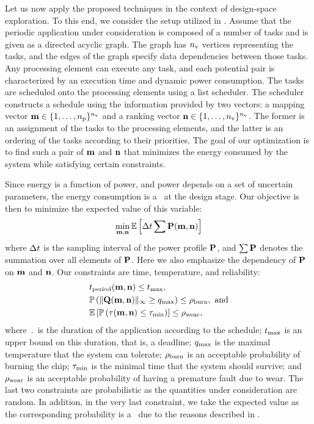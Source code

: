 Let us now apply the proposed techniques in the context of design-space exploration.
To this end, we consider the setup utilized in \cite{ukhov2012}.
Assume that the periodic application under consideration is composed of a number of tasks and is given as a directed acyclic graph.
The graph has ${n_\text{v}}$ vertices representing the tasks, and the edges of the graph specify data dependencies between those tasks.
Any processing element can execute any task, and each potential pair is characterized by an execution time and dynamic power consumption.
The tasks are scheduled onto the processing elements using a list scheduler.
The scheduler constructs a schedule using the information provided by two vectors: a mapping vector $\mathbf{m} \in \{ 1, \dotsc, {n_\text{p}} \}^{n_\text{v}}$ and a ranking vector $\mathbf{n} \in \{ 1, \dotsc, {n_\text{v}} \}^{n_\text{v}}$.
The former is an assignment of the tasks to the processing elements, and the latter is an ordering of the tasks according to their priorities.
The goal of our optimization is to find such a pair of $\mathbf{m}$ and $\mathbf{n}$ that minimizes the energy consumed by the system while satisfying certain constraints.

Since energy is a function of power, and power depends on a set of uncertain parameters, the energy consumption is a \rv\ at the design stage.
Our objective is then to minimize the expected value of this variable:
\begin{equation} \elab{objective}
  \min_{\mapping, \priority} \expectation{\dt \sum \mP(\mapping, \priority)}
\end{equation}
where $\Delta t$ is the sampling interval of the power profile $\mathbf{P}$, and $\sum \mathbf{P}$ denotes the summation over all elements of $\mathbf{P}$.
Here we also emphasize the dependency of $\mathbf{P}$ on $\mathbf{m}$ and $\mathbf{n}$.
Our constraints are time, temperature, and reliability:
\begin{equation} \elab{constraints}
  \begin{aligned}
    & \period(\mapping, \priority) \leq \t_\maximal, \\
    & \probabilityMeasure\left( \norm[\infty]{\mQ(\mapping, \priority)} \geq \q_\maximal \right) \leq \pr_\burn, \text{ and} \\
    & \expectation{\probabilityMeasure\left( \T(\mapping, \priority) \leq \T_\minimal \right)} \leq \pr_\wear,
  \end{aligned}
\end{equation}
where $\period$ is the duration of the application according to the schedule; $t_{\text{max}}$ is an upper bound on this duration, that is, a deadline; $q_{\text{max}}$ is the maximal temperature that the system can tolerate; $\rho_{\text{burn}}$ is an acceptable probability of burning the chip; $\tau_{\text{min}}$ is the minimal time that the system should survive; and $\rho_{\text{wear}}$ is an acceptable probability of having a premature fault due to wear.
The last two constraints are probabilistic as the quantities under consideration are random.
In addition, in the very last constraint, we take the expected value as the corresponding probability is a \rv\ due to the reasons described in .

